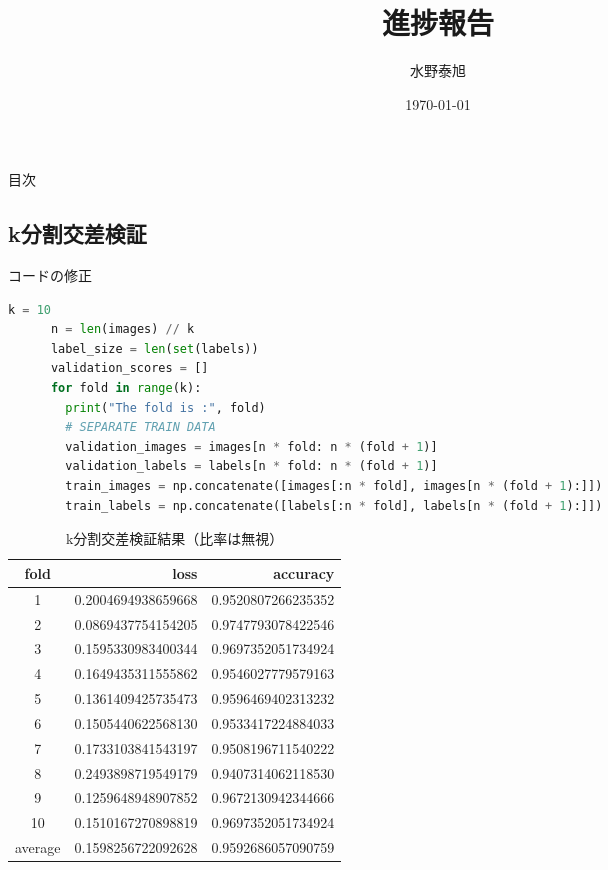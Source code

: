 \documentclass{beamer}
\title{進捗報告}
\date{\today}
\author{水野泰旭}
\institute{弘前大学理工学部電子情報工学科４年}
\begin{document}
  \maketitle
  
\begin{frame}{目次}
    \tableofcontents
  \end{frame}

  \begin{frame}
    \section{k分割交差検証}
  \end{frame}

  \begin{frame}[fragile]{コードの修正}
    \begin{lstlisting}[language=Python, caption=kseparate\_train.py, label=cd:keseparate_train.py]
      k = 10
      n = len(images) // k
      label_size = len(set(labels))
      validation_scores = []
      for fold in range(k):
        print("The fold is :", fold)
        # SEPARATE TRAIN DATA
        validation_images = images[n * fold: n * (fold + 1)]
        validation_labels = labels[n * fold: n * (fold + 1)]
        train_images = np.concatenate([images[:n * fold], images[n * (fold + 1):]])
        train_labels = np.concatenate([labels[:n * fold], labels[n * (fold + 1):]])
      \end{lstlisting}
  \end{frame}

  \begin{frame}
    \begin{table}[H]
      \centering
      \caption{k分割交差検証結果（比率は無視）}
      \begin{tabular}{crr}
        \toprule
        fold & loss & accuracy \\
        \midrule
        1 & 0.2004694938659668 & 0.9520807266235352 \\
        2 & 0.0869437754154205 & 0.9747793078422546 \\
        3 & 0.1595330983400344 & 0.9697352051734924 \\
        4 & 0.1649435311555862 & 0.9546027779579163 \\ 
        5 & 0.1361409425735473 & 0.9596469402313232 \\
        6 & 0.1505440622568130 & 0.9533417224884033 \\
        7 & 0.1733103841543197 & 0.9508196711540222 \\
        8 & 0.2493898719549179 & 0.9407314062118530 \\
        9 & 0.1259648948907852 & 0.9672130942344666 \\
        10 & 0.1510167270898819 & 0.9697352051734924 \\
        \midrule
        average & 0.1598256722092628 & 0.9592686057090759 \\
        \bottomrule
      \end{tabular}
    \end{table}
  \end{frame}
  
\end{document}
